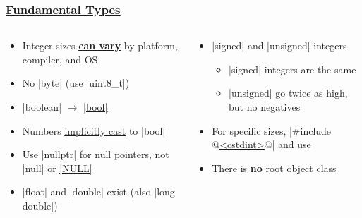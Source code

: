 \documentclass[glossy]{beamer}
\newcommand{\cppref}[2]{\href{http://en.cppreference.com/w/cpp/#1}{\underline{#2}}}
\begin{document}
\begin{frame}[fragile=singleslide]
  \frametitle{\cppref{language/types}{Fundamental Types}}
  \begin{columns}[t]
    \begin{column}{6cm}
      \begin{itemize}
        \item Integer sizes \cppref{language/types\#Data_models}{\textbf{can vary}} by platform, compiler, and OS
        \item No \javainline|byte| (use \cppinline|uint8_t|)
        \item \javainline|boolean| $\rightarrow$ \cppref{language/types\#Boolean_type}{\cppinline|bool|}
        \item Numbers \cppref{language/implicit_cast}{implicitly cast} to \cppinline|bool|
        \item Use \cppref{language/nullptr}{\cppinline|nullptr|} for null pointers, not \javainline|null| or \cppref{types/NULL}{\cppinline|NULL|}
        \item \cppinline|float| and \cppinline|double| exist (also \cppinline|long double|)
      \end{itemize}
    \end{column}

    \begin{column}{6cm}
      \begin{itemize}
        \item \cppinline|signed| and \cppinline|unsigned| integers
        \begin{itemize}
          \item \cppinline|signed| integers are the same
          \item \cppinline|unsigned| go twice as high, but no negatives
        \end{itemize}
        \item For specific sizes, \cppinline|#include @\cppref{preprocessor/include}{<cstdint>}@| and use 
        \item There is \textbf{no} root object class
      \end{itemize}
    \end{column}
  \end{columns}
\end{frame}
\end{document}
